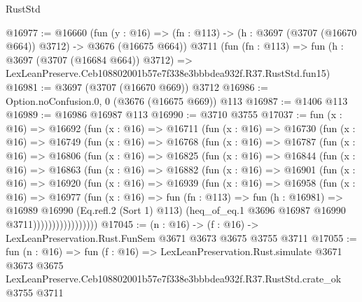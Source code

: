 \begin{lexlean}{RustStd}
\begin{coremodule}
@16977 := @16660
    (fun (y : @16) => (fn : @113) -> (h : @3697 (@3707 (@16670 @664)) @3712) -> @3676 (@16675 @664))
    @3711
    (fun (fn : @113) =>
    fun (h : @3697 (@3707 (@16684 @664)) @3712) =>
    LexLeanPreserve.Ceb108802001b57e7f338e3bbbdea932f.R37.RustStd.fun15)
@16981 := @3697 (@3707 (@16670 @669)) @3712
@16986 := Option.noConfusion.{0, 0} (@3676 (@16675 @669)) @113
@16987 := @1406 @113
@16989 := @16986 @16987 @113
@16990 := @3710 @3755
@17037 := fun (x : @16) =>
  @16692
    (fun (x : @16) =>
    @16711
      (fun (x : @16) =>
      @16730
        (fun (x : @16) =>
        @16749
          (fun (x : @16) =>
          @16768
            (fun (x : @16) =>
            @16787
              (fun (x : @16) =>
              @16806
                (fun (x : @16) =>
                @16825
                  (fun (x : @16) =>
                  @16844
                    (fun (x : @16) =>
                    @16863
                      (fun (x : @16) =>
                      @16882
                        (fun (x : @16) =>
                        @16901
                          (fun (x : @16) =>
                          @16920
                            (fun (x : @16) =>
                            @16939
                              (fun (x : @16) =>
                              @16958
                                (fun (x : @16) =>
                                @16977
                                  (fun (x : @16) =>
                                  fun (fn : @113) =>
                                  fun (h : @16981) =>
                                  @16989
                                    @16990
                                    (Eq.refl.{2} (Sort 1) @113)
                                    (heq_of_eq.{1} @3696 @16987 @16990 @3711)))))))))))))))))
@17045 := (n : @16) -> (f : @16) -> LexLeanPreservation.Rust.FunSem @3671 @3673 @3675 @3755 @3711
@17055 := fun (n : @16) =>
  fun (f : @16) =>
  LexLeanPreservation.Rust.simulate
    @3671
    @3673
    @3675
    LexLeanPreserve.Ceb108802001b57e7f338e3bbbdea932f.R37.RustStd.crate_ok
    @3755
    @3711
\end{coremodule}
\end{lexlean}
